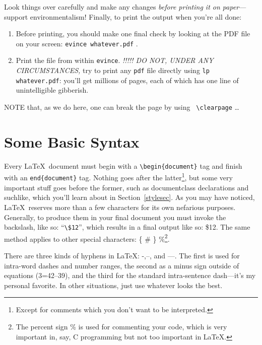 \documentclass[12pt,preprint]{aastex}
\begin{document}
Look things over carefully and make any changes {\it before printing it
on paper}---support environmentalism!  Finally, to print the output when
you're all done:
\begin{enumerate}

\item Before printing, you should make one final check by looking
at the PDF file on your screen: {\tt evince whatever.pdf} .

\item Print the file from within {\tt evince}. {\it !!!!! DO NOT, UNDER
  ANY CIRCUMSTANCES,} try to print any {\tt pdf} file directly using
  {\tt lp whatever.pdf}: you'll get millions of pages, each of which has
  one line of unintelligible gibberish.
\end{enumerate}

NOTE that, as we do here, one can break the page by using {\tt
  \verb&\&clearpage} \dots
\clearpage

\section{Some Basic Syntax}\label{basicsec}

Every \LaTeX\ document must begin with a \verb&\begin{document}& tag and
finish with an {\tt end\{document\}} tag.  Nothing goes after the
latter\footnote{Except for comments which you don't want to be
  interpreted.}, but some very important stuff goes before the former,
such as documentclass declarations and suchlike, which you'll learn
about in Section~\ref{stylesec}.
As you may have noticed, \LaTeX\ reserves more than a few characters for
its own nefarious purposes.  Generally, to produce them in your final
document you must invoke the backslash, like so: ``\verb&\$12&'', which
results in a final output like so: \$12.  The same method applies to other
special characters: \{ \# \} \%\footnote{The percent sign \% is used for
commenting your code, which is very important in, say, C programming but
not too important in \LaTeX.}.  

There are three kinds of hyphens in \LaTeX: -,--, and ---.  The first is
used for intra-word dashes and number ranges, the second as a minus sign
outside of equations (3=42--39), and the third for the standard
intra-sentence dash---it's my personal favorite.  In other situations,
just use whatever looks the best.
\end{document}
